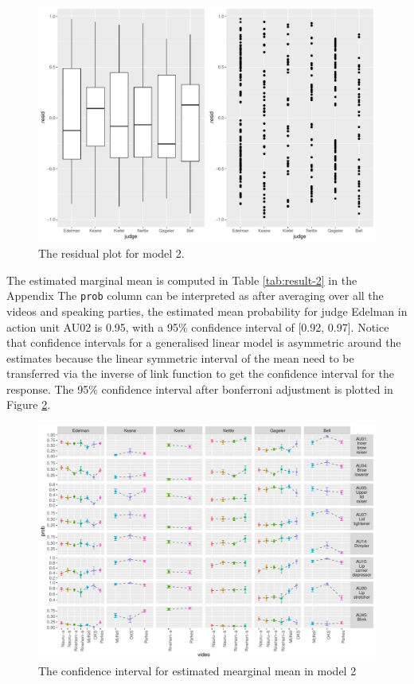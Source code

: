 \documentclass{monashthesis}
\begin{document}
\begin{figure}

{\centering \includegraphics[width=1\linewidth]{figures/resid-1} 

}

\caption{The residual plot for model 2. }\label{fig:resid}
\end{figure}

The estimated marginal mean is computed in Table \ref{tab:result-2} in the Appendix The \texttt{prob} column can be interpreted as after averaging over all the videos and speaking parties, the estimated mean probability for judge Edelman in action unit AU02 is 0.95, with a 95\% confidence interval of {[}0.92, 0.97{]}. Notice that confidence intervals for a generalised linear model is asymmetric around the estimates because the linear symmetric interval of the mean need to be transferred via the inverse of link function to get the confidence interval for the response. The 95\% confidence interval after bonferroni adjustment is plotted in Figure \ref{fig:model2-plot}.

\begin{figure}

{\centering \includegraphics[width=1\linewidth]{figures/model2-plot-1} 

}

\caption{The confidence interval for estimated mearginal mean in model 2}\label{fig:model2-plot}
\end{figure}
\end{document}
